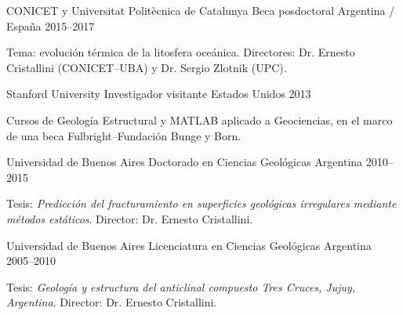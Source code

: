 
\begin{cventries}

\cventry
    {CONICET y Universitat Politècnica de Catalunya}
    {Beca posdoctoral}
    {Argentina / España}
    {2015--2017}
    {
      \begin{cvitems}
        \item {Tema: evolución térmica de la litosfera oceánica. Directores: Dr. Ernesto Cristallini (CONICET--UBA) y Dr. Sergio Zlotnik (UPC).}
      \end{cvitems}
    }

\cventry
    {Stanford University}
    {Investigador visitante}
    {Estados Unidos}
    {2013}
    {
      \begin{cvitems}
        \item {Cursos de Geología Estructural y MATLAB aplicado a Geociencias, en el marco de una beca Fulbright--Fundación Bunge y Born.}
      \end{cvitems}
    }

\cventry
    {Universidad de Buenos Aires}
    {Doctorado en Ciencias Geológicas}
    {Argentina}
    {2010--2015}
    {
      \begin{cvitems}
        \item {Tesis: \emph{Predicción del fracturamiento en superficies geológicas irregulares mediante métodos estáticos}. Director: Dr. Ernesto Cristallini.}
      \end{cvitems}
    }

\cventry
    {Universidad de Buenos Aires}
    {Licenciatura en Ciencias Geológicas}
    {Argentina}
    {2005--2010}
    {
      \begin{cvitems}
        \item {Tesis: \emph{Geología y estructura del anticlinal compuesto Tres Cruces, Jujuy, Argentina}. Director: Dr. Ernesto Cristallini.}
      \end{cvitems}
    }

\end{cventries}

